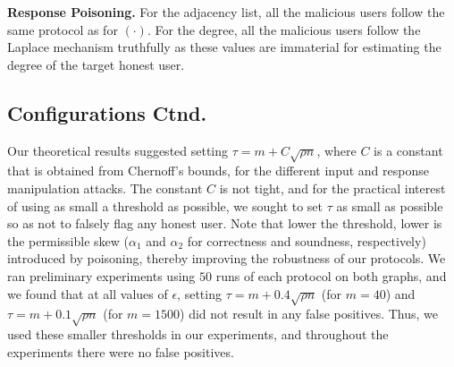 \noindent\textbf{Response Poisoning.} 
For the adjacency list, all the malicious users follow the same protocol as for \DegRRCheck$(\cdot)$. For the degree, all the malicious users follow the Laplace mechanism truthfully as these values are immaterial for estimating the degree of the target honest user.

\subsection{Configurations Ctnd.}
Our theoretical results suggested setting $\tau = m + C\sqrt{\rho n}$, where $C$ is a constant that is obtained from Chernoff's bounds, for the different input and response manipulation attacks. The constant $C$ is not tight, and for the practical interest of using as small a threshold as possible, we sought to set $\tau$ as small as possible so as not to falsely flag any honest user. Note that lower the threshold, lower is the permissible skew ($\alpha_1$ and $\alpha_2$  for correctness  and  soundness, respectively) introduced by poisoning, thereby improving the robustness of our protocols. We ran preliminary experiments using $50$ runs of each protocol on both graphs, and we found that at all values of $\epsilon$, setting $\tau = m + 0.4\sqrt{\rho n}$ (for $m = 40$) and $\tau = m + 0.1 \sqrt{\rho n}$ (for $m = 1500$) did not result in any false positives. Thus, we used these smaller thresholds in our experiments, and throughout the experiments there were no false positives.